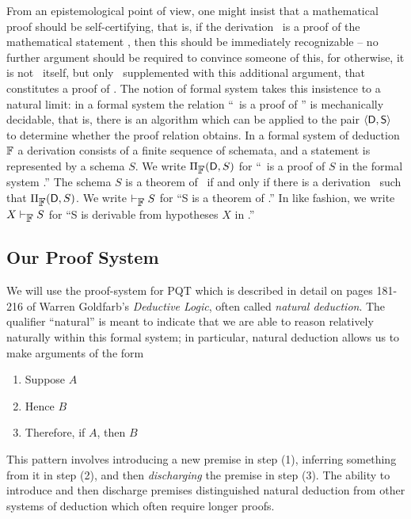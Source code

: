 From an epistemological point of view, one might insist that a mathematical proof should be self-certifying, that is, if the derivation \ is a proof of the mathematical statement , then this should be immediately recognizable -- no further argument should be required to convince someone of this, for otherwise, it is not \ itself, but only \ supplemented with this additional argument, that constitutes a proof of . The notion of formal system takes this insistence to a natural limit: in a formal system the relation ``\ is a proof of '' is mechanically decidable, that is, there is an algorithm which can be applied to the pair $\mbox{$\langle \mbox{$\mathsf{D}$},\mbox{$\mathsf{S}$} \rangle$}$ to determine whether the proof relation obtains. In a formal system of deduction $\mbox{$\mathbb{F}$}$ a derivation  consists of a finite sequence of schemata, and a statement  is represented by a schema $S$. We write $\Pi_{\mbox{$\mathbb{F}$}}(\mbox{$\mathsf{D}$},S)$ for ``\ is a proof of $S$ in the formal system .'' The schema $S$ is a theorem of \ if and only if there is a derivation \ such that $\Pi_{\mbox{$\mathbb{F}$}}(\mbox{$\mathsf{D}$},S)$. We write $\vdash_{\mbox{$\mathbb{F}$}}S$ for ``S is a theorem of .'' In like fashion, we write $X\vdash_{\mbox{$\mathbb{F}$}}S$ for ``S is derivable from hypotheses $X$ in .''




\subsection*{Our Proof System}
We will use the proof-system for PQT which is described in detail on pages 181-216 of Warren Goldfarb's \emph{Deductive Logic}, often called \emph{natural deduction}. The qualifier ``natural'' is meant to indicate that we are able to reason relatively naturally within this formal system; in particular, natural deduction allows us to make arguments of the form
\begin{enumerate}
     \item Suppose $A$
     \item Hence $B$
     \item Therefore, if $A$, then $B$
\end{enumerate} 
This pattern involves introducing a new premise in step (1), inferring something from it in step (2), and then \emph{discharging} the premise in step (3). The ability to introduce and then discharge premises distinguished natural deduction from other systems of deduction which often require longer proofs. 

